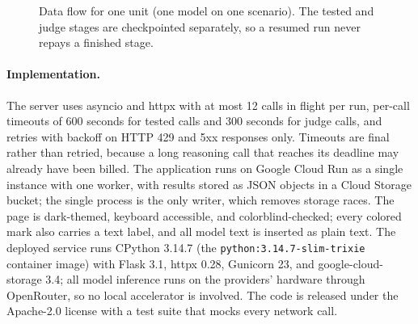 \begin{figure}[!t]
{%
    }
    \caption{Data flow for one unit (one model on one scenario). The tested and judge stages are checkpointed separately, so a resumed run never repays a finished stage.}
    \label{fig:architecture}
\end{figure}

\paragraph{Implementation.} The server uses asyncio and httpx with at most 12 calls in flight per run, per-call timeouts of 600 seconds for tested calls and 300 seconds for judge calls, and retries with backoff on HTTP 429 and 5xx responses only. Timeouts are final rather than retried, because a long reasoning call that reaches its deadline may already have been billed. The application runs on Google Cloud Run as a single instance with one worker, with results stored as JSON objects in a Cloud Storage bucket; the single process is the only writer, which removes storage races. The page is dark-themed, keyboard accessible, and colorblind-checked; every colored mark also carries a text label, and all model text is inserted as plain text. The deployed service runs CPython 3.14.7 (the \texttt{python:3.14.7-slim-trixie} container image) with Flask 3.1, httpx 0.28, Gunicorn 23, and google-cloud-storage 3.4; all model inference runs on the providers' hardware through OpenRouter, so no local accelerator is involved. The code is released under the Apache-2.0 license with a test suite that mocks every network call.


